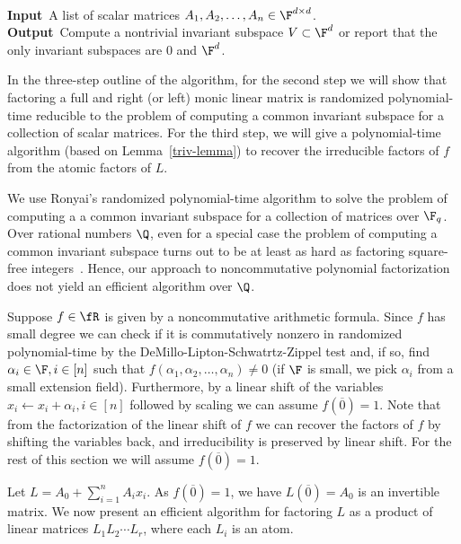 \begin{problem}\hfill{~}\\
\textbf{Input}~A list of scalar matrices $A_1,A_2,\ldots,A_n\in
\F^{d\times d}$.\\
\textbf{Output}~Compute a nontrivial invariant
subspace $V\subset \F^d$ or report that the only invariant subspaces
are $0$ and $\F^d$.
\end{problem}  

In the three-step outline of the algorithm, for the second step we
will show that factoring a full and right (or left) 
monic linear matrix is randomized polynomial-time reducible to the
problem of computing a common invariant subspace for a collection of
scalar matrices. For the third step, we will give a polynomial-time
algorithm (based on Lemma~\ref{triv-lemma}) to recover the irreducible
factors of $f$ from the atomic factors of $L$.

\begin{remark}
  We use Ronyai's randomized polynomial-time algorithm \cite{Ronyai2}
  to solve the problem of computing a a common invariant subspace for
  a collection of matrices over $\F_q$.  Over rational numbers $\Q$,
  even for a special case the problem of computing a common invariant
  subspace turns out to be at least as hard as factoring square-free
  integers~\cite{FR85}. Hence, our approach to noncommutative
  polynomial factorization does not yield an efficient algorithm over
  $\Q$.
\end{remark}

Suppose $f\in\fR$ is given by a noncommutative arithmetic
formula. Since $f$ has small degree we can check if it is
commutatively nonzero in randomized polynomial-time by the
DeMillo-Lipton-Schwatrtz-Zippel test \cite{DL78,Sch80,Zip79} and, if
so, find $\alpha_i\in\F, i\in[n]$ such that
$f(\alpha_1,\alpha_2,\ldots,\alpha_n)\ne 0$ (if $\F$ is small, we pick
$\alpha_i$ from a small extension field). Furthermore, by a linear
shift of the variables $x_i\leftarrow x_i + \alpha_i, i\in[n]$
followed by scaling we can assume $f(\overline{0}) = 1$. Note that
from the factorization of the linear shift of $f$ we can recover the
factors of $f$ by shifting the variables back, and irreducibility is
preserved by linear shift. For the rest of this section we will
assume $f(\overline{0})=1$. 

Let $L=A_0+\sum_{i=1}^n A_i x_i$. As $f(\overline{0})=1$, we have
$L(\overline{0})=A_0$ is an invertible matrix. We now present an
efficient algorithm for factoring $L$ as a product of linear matrices
$L_1L_2\cdots L_r$, where each $L_i$ is an atom.

